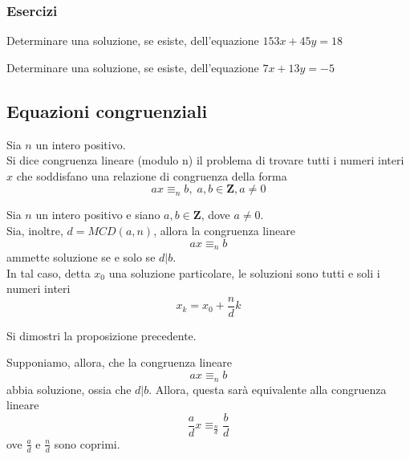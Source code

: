 \begin{flushleft}
\subsubsection{Esercizi}
\begin{esercizio}
Determinare una soluzione, se esiste, dell'equazione $153x + 45y = 18$
\end{esercizio}
\vspace{150px}



\begin{esercizio}
Determinare una soluzione, se esiste, dell'equazione $7x + 13y = -5$
\end{esercizio}
\vspace{150px}


\subsection{Equazioni congruenziali}
\begin{definizione}
Sia $n$ un intero positivo.\\
Si dice congruenza lineare (modulo n) il problema di trovare tutti i numeri interi $x$ che soddisfano una relazione di congruenza della forma
\[ax \equiv_n b,\;a,b\in \mathbf{Z}, a\neq 0\]
\end{definizione}

\begin{proposizione}
Sia $n$ un intero positivo e siano $a, b \in \mathbf{Z}$, dove $a\neq 0$.\\
Sia, inoltre, $d = MCD(a, n)$, allora la congruenza lineare
\[ax \equiv_n b\]
ammette soluzione se e solo se $d|b$.\\
In tal caso, detta $x_0$ una soluzione particolare, le soluzioni sono tutti e soli i numeri interi
\[x_k = x_0 + \frac{n}{d}k\]
\end{proposizione}
\begin{esercizio}
Si dimostri la proposizione precedente.
\end{esercizio}
\vspace{200px}
\begin{osservazione}
Supponiamo, allora, che la congruenza lineare
\[ax \equiv_n b\]
abbia soluzione, ossia che $d|b$.
Allora, questa sarà equivalente alla congruenza lineare
\[\frac{a}{d}x \equiv_\frac{n}{d} \frac{b}{d}\]
ove $\frac{a}{d}$ e $\frac{n}{d}$ sono coprimi.
\end{osservazione}


\end{flushleft}
